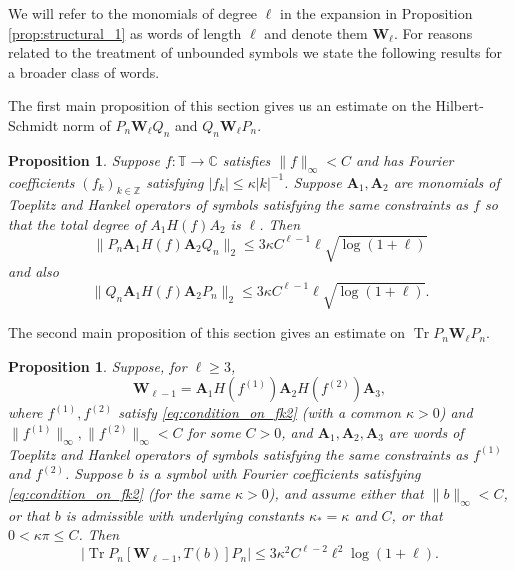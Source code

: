 \documentclass[11pt]{amsart}
\theoremstyle{plain}
\newtheorem{proposition}[theorem]{Proposition}
\theoremstyle{remark}
\DeclareMathOperator{\Tr}{Tr}
\numberwithin{equation}{section}
\begin{document}
We will refer to the monomials of degree $\ell$ in the expansion in Proposition \ref{prop:structural_1} as words of length $\ell$ and denote them $\mathbf{W}_{\ell}$. 
%
For reasons related to the treatment of unbounded symbols we state the following results for a broader class of words. %
%
%


The first main proposition of this section gives us an estimate on the Hilbert-Schmidt norm of $P_n\mathbf{W}_{\ell}Q_n$ and $Q_n \mathbf{W}_{\ell} P_n$.
\begin{proposition}\label{prop:word_corner}
Suppose $f:\mathbb{T}\rightarrow\mathbb{C}$ satisfies $\|f\|_{\infty}<C$ and has Fourier coefficients $(f_k)_{k\in\mathbb{Z}}$ satisfying $|f_k|\leq \kappa|k|^{-1}$.
Suppose $\mathbf{A}_1, \mathbf{A}_2$ are monomials of Toeplitz and Hankel operators of symbols satisfying the same constraints as $f$ so that the total degree of 
$A_1 H(f) A_2$ is $\ell$.
Then
\begin{equation}
\|P_n \mathbf{A}_1 H(f)\mathbf{A}_2 Q_n\|_2
\leq 
3\kappa C^{\ell-1} \ell \sqrt{\log(1+\ell)}
\end{equation}
and also
\begin{equation}
\|Q_n \mathbf{A}_1 H(f)\mathbf{A}_2 P_n\|_2\leq 3\kappa C^{\ell-1} \ell \sqrt{\log(1+\ell)}.
\end{equation}
\end{proposition}

The second main proposition of this section gives an estimate on $\Tr P_n \mathbf{W}_{\ell} P_n$. 
\begin{proposition}\label{prop:word_trace}
Suppose, for $\ell\geq 3$,
\begin{equation}\label{eqn:form_5_operators}
\mathbf{W}_{\ell-1}=\mathbf{A}_1H(f^{(1)})\mathbf{A}_2 H(f^{(2)}) \mathbf{A}_3, 
\end{equation}
where $f^{(1)}, f^{(2)}$ satisfy \eqref{eq:condition_on_fk2} (with a common $\kappa>0$) and $\|f^{(1)}\|_{\infty}, \|f^{(2)}\|_{\infty}<C$ for some $C>0$, and
$\mathbf{A}_1, \mathbf{A}_2, \mathbf{A}_3$ are words of Toeplitz and Hankel operators of symbols satisfying the same constraints as $f^{(1)}$ and $f^{(2)}$.
Suppose $b$ is a symbol with Fourier coefficients 
satisfying \eqref{eq:condition_on_fk2} (for the same $\kappa>0$), and assume either that $\|b\|_{\infty}<C$, or that $b$ is admissible with underlying constants $\kappa_*=\kappa$ and $C$, or that $0<\kappa \pi\leq C$.
%
%
Then
\begin{equation}
| \Tr P_n[ \mathbf{W}_{\ell-1}, T(b)]P_n |
\leq 3 \kappa^2  C^{\ell-2} \ell^2 \log(1+\ell).
\end{equation}
\end{proposition}
\end{document}
